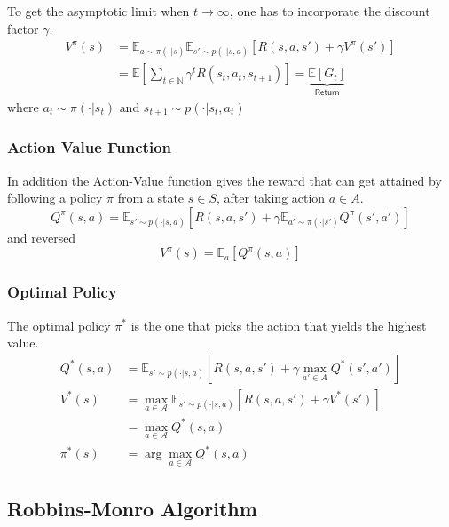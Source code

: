 \newpar{}

To get the asymptotic limit when $t \to \infty$, one has to incorporate the discount factor $\gamma$.
\begin{align*}
    V^{\pi}(s) & = \mathbb{E}_{a \sim \pi(\cdot|s)} \mathbb{E}_{s' \sim p(\cdot|s, a)} \left[R(s,a,s') + \gamma V^{\pi}(s')\right]                      \\
               & = \mathbb{E}\left[\sum_{t\in \mathbb{N}}\gamma^t R(s_t,a_t,s_{t+1})\right] = \underbrace{\mathbb{E}\left[G_t\right]}_{\textsf{Return}}
\end{align*}
where $a_t \sim \pi(\cdot | s_t) \text{ and } s_{t+1}\sim p(\cdot | s_t,a_t)$

\subsubsection{Action Value Function}
In addition the Action-Value function gives the reward that can get attained by following a policy $\pi$ from a state $s \in S$,
after taking action $a \in A$.
\begin{equation*}
    Q^\pi(s,a) = \mathbb{E}_{s' \sim p(\cdot|s,a)}\left[R(s,a,s')+\gamma \mathbb{E}_{a'\sim \pi(\cdot|s')} Q^\pi(s',a')\right]
\end{equation*}
and reversed
\begin{equation*}
    V^\pi(s) = \mathbb{E}_a \left[ Q^\pi (s,a)\right]
\end{equation*}

\subsubsection{Optimal Policy}
The optimal policy $\pi^*$ is the one that picks the action that yields the highest value.
\begin{align*}
    Q^*(s,a) & = \mathbb{E}_{s'\sim p(\cdot|s,a)}\left[R(s,a,s') + \gamma \max_{a'\in A}Q^* (s',a')\right]     \\
    V^*(s)   & = \max_{a\in \mathcal{A}}\mathbb{E}_{s'\sim p(\cdot|s,a)}\left[R(s,a,s')+\gamma V^* (s')\right] \\
             & = \max_{a\in \mathcal{A}} Q^{*}(s,a)                                                            \\  
    \pi^{*}(s)  & = \arg \max_{a\in \mathcal{A}} Q^{*}(s,a)
\end{align*}

\subsection{Robbins-Monro Algorithm}

